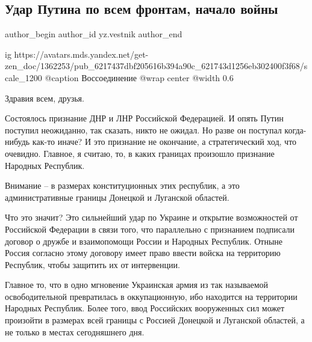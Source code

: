  
 
 
 
 
 
\subsection{Удар Путина по всем фронтам, начало войны}
\label{sec:24_02_2022.yz.vestnik.1.udar_putina}
 
\ifcmt
 author_begin
   author_id yz.vestnik
 author_end
\fi

\ifcmt
  ig https://avatars.mds.yandex.net/get-zen_doc/1362253/pub_6217437dbf205616b394a90c_621743d1256eb302400f3f68/scale_1200
  @caption Воссоединение
  @wrap center
  @width 0.6
\fi

Здравия всем, друзья.

Состоялось признание ДНР и ЛНР Российской Федерацией. И опять Путин поступил
неожиданно, так сказать, никто не ожидал. Но разве он поступал когда-нибудь
как-то иначе? И это признание не окончание, а стратегический ход, что очевидно.
Главное, я считаю, то, в каких границах произошло признание Народных Республик.

\begin{zznagolos}
Внимание – в размерах конституционных этих республик, а это административные границы Донецкой и Луганской областей. 
\end{zznagolos}

Что это значит? Это сильнейший удар по Украине и открытие возможностей от
Российской Федерации в связи того, что параллельно с признанием подписали
договор о дружбе и взаимопомощи России и Народных Республик. Отныне Россия
согласно этому договору имеет право ввести войска на территорию Республик,
чтобы защитить их от интервенции.

Главное то, что в одно мгновение Украинская армия из так называемой
освободительной превратилась в оккупационную, ибо находится на территории
Народных Республик. Более того, ввод Российских вооруженных сил может произойти
в размерах всей границы с Россией Донецкой и Луганской областей, а не только в
местах сегодняшнего дня.

